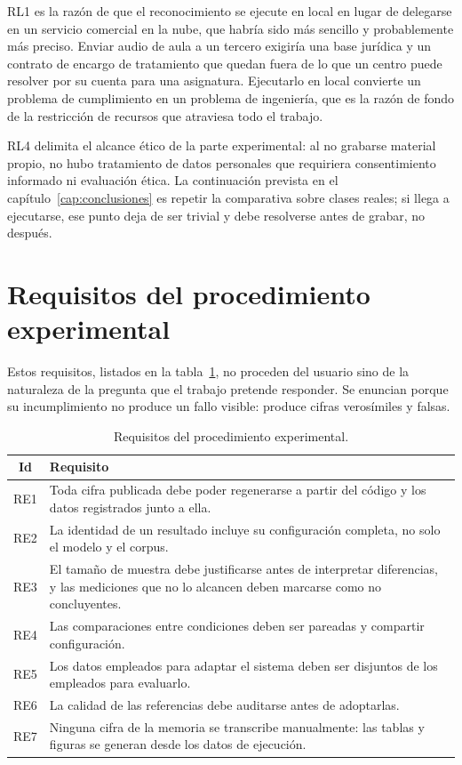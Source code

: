 RL1 es la razón de que el reconocimiento se ejecute en local en lugar de delegarse en un
servicio comercial en la nube, que habría sido más sencillo y probablemente más preciso.
Enviar audio de aula a un tercero exigiría una base jurídica y un contrato de encargo de
tratamiento \cite{ue2016rgpd} que quedan fuera de lo que un centro puede resolver por su
cuenta para una asignatura. Ejecutarlo en local convierte un problema de cumplimiento en un
problema de ingeniería, que es la razón de fondo de la restricción de recursos que atraviesa
todo el trabajo.

RL4 delimita el alcance ético de la parte experimental: al no grabarse material propio, no
hubo tratamiento de datos personales que requiriera consentimiento informado ni evaluación
ética. La continuación prevista en el capítulo~\ref{cap:conclusiones} es repetir la
comparativa sobre clases reales; si llega a ejecutarse, ese punto deja de ser trivial y debe
resolverse antes de grabar, no después.

\section{Requisitos del procedimiento experimental}

Estos requisitos, listados en la tabla~\ref{tab:re}, no proceden del usuario sino de la
naturaleza de la pregunta que el trabajo pretende responder. Se enuncian porque su
incumplimiento no produce un fallo visible: produce cifras verosímiles y falsas.

\begin{table}[h]
\centering
\small
\begin{tabular}{|c|p{11cm}|}
\hline
\textbf{Id} & \textbf{Requisito} \\
\hline
RE1 & Toda cifra publicada debe poder regenerarse a partir del código y los datos
       registrados junto a ella. \\
\hline
RE2 & La identidad de un resultado incluye su configuración completa, no solo el modelo y
       el corpus. \\
\hline
RE3 & El tamaño de muestra debe justificarse antes de interpretar diferencias, y las
       mediciones que no lo alcancen deben marcarse como no concluyentes. \\
\hline
RE4 & Las comparaciones entre condiciones deben ser pareadas y compartir configuración. \\
\hline
RE5 & Los datos empleados para adaptar el sistema deben ser disjuntos de los empleados
       para evaluarlo. \\
\hline
RE6 & La calidad de las referencias debe auditarse antes de adoptarlas. \\
\hline
RE7 & Ninguna cifra de la memoria se transcribe manualmente: las tablas y figuras se
       generan desde los datos de ejecución. \\
\hline
\end{tabular}
\caption{Requisitos del procedimiento experimental.}
\label{tab:re}
\end{table}


